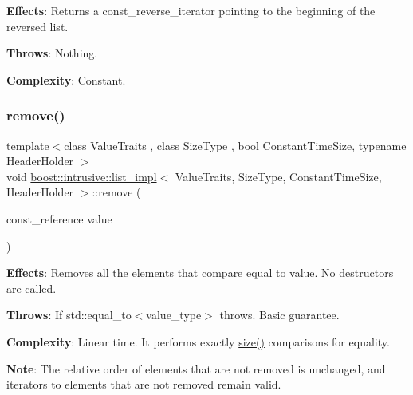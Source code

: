 {\bfseries Effects}\+: Returns a const\+\_\+reverse\+\_\+iterator pointing to the beginning of the reversed list.

{\bfseries Throws}\+: Nothing.

{\bfseries Complexity}\+: Constant. \mbox{\label{classboost_1_1intrusive_1_1list__impl_a67b3e202dc68b3de5643c2abf40847f7}} 
\subsubsection{\texorpdfstring{remove()}{remove()}}
{\footnotesize\ttfamily template$<$class Value\+Traits , class Size\+Type , bool Constant\+Time\+Size, typename Header\+Holder $>$ \\
void \hyperlink{classboost_1_1intrusive_1_1list__impl}{boost\+::intrusive\+::list\+\_\+impl}$<$ Value\+Traits, Size\+Type, Constant\+Time\+Size, Header\+Holder $>$\+::remove (\begin{DoxyParamCaption}\item[{const\+\_\+reference}]{value }\end{DoxyParamCaption})\hspace{0.3cm}{\ttfamily [inline]}}

{\bfseries Effects}\+: Removes all the elements that compare equal to value. No destructors are called.

{\bfseries Throws}\+: If std\+::equal\+\_\+to$<$value\+\_\+type$>$ throws. Basic guarantee.

{\bfseries Complexity}\+: Linear time. It performs exactly \hyperlink{classboost_1_1intrusive_1_1list__impl_a9da0074a31566f3a7dbc3cd1a2d752c1}{size()} comparisons for equality.

{\bfseries Note}\+: The relative order of elements that are not removed is unchanged, and iterators to elements that are not removed remain valid. \mbox{\label{classboost_1_1intrusive_1_1list__impl_ab52f7ab80a51b6364f950a3e7521018b}} 
